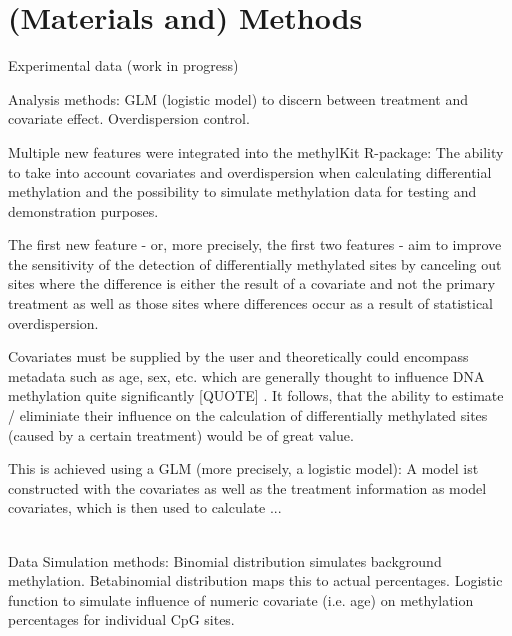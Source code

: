 \section{(Materials and) Methods}

Experimental data (work in progress)

Analysis methods: GLM (logistic model) to discern between treatment and covariate effect. 
Overdispersion control.

Multiple new features were integrated into the methylKit R-package: The ability to take into account covariates and overdispersion when calculating differential methylation and the possibility to simulate methylation data for testing and demonstration purposes.

The first new feature - or, more precisely, the first two features - aim to  improve the sensitivity of the detection of differentially methylated sites by canceling out sites where the difference is either the result of a covariate and not the primary treatment as well as those sites where differences occur as a result of statistical overdispersion.

Covariates must be supplied by the user and theoretically could encompass metadata such as age, sex, etc. which are generally thought to influence DNA methylation quite significantly [QUOTE] . It follows, that the ability to estimate / eliminiate their influence on the calculation of differentially methylated sites (caused by a certain treatment) would be of great value.

This is achieved using a GLM (more precisely, a logistic model): A model ist constructed with the covariates as well as the treatment information as model covariates, which is then used to calculate ...

\\
Data Simulation methods: Binomial distribution simulates background methylation. 
Betabinomial distribution maps this to actual percentages.
Logistic function to simulate influence of numeric covariate (i.e. age) on methylation percentages for individual CpG sites.
  
  